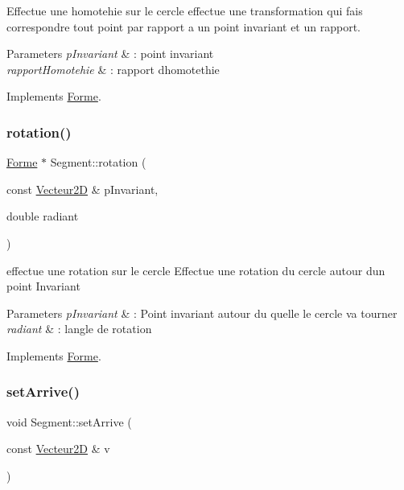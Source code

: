 Effectue une homotehie sur le cercle effectue une transformation qui fais correspondre tout point par rapport a un point invariant et un rapport. 


\begin{DoxyParams}{Parameters}
{\em p\+Invariant} & \+: point invariant \\
\hline
{\em rapport\+Homotehie} & \+: rapport d\textquotesingle{}homotethie \\
\hline
\end{DoxyParams}


Implements \mbox{\hyperlink{class_forme}{Forme}}.

\mbox{\label{class_segment_ae36f2f88b61ba79119398652411eb49b}} 
\subsubsection{\texorpdfstring{rotation()}{rotation()}}
{\footnotesize\ttfamily \mbox{\hyperlink{class_forme}{Forme}} $\ast$ Segment\+::rotation (\begin{DoxyParamCaption}\item[{const \mbox{\hyperlink{class_vecteur2_d}{Vecteur2D}} \&}]{p\+Invariant,  }\item[{double}]{radiant }\end{DoxyParamCaption})\hspace{0.3cm}{\ttfamily [virtual]}}



effectue une rotation sur le cercle Effectue une rotation du cercle autour d\textquotesingle{}un point Invariant 


\begin{DoxyParams}{Parameters}
{\em p\+Invariant} & \+: Point invariant autour du quelle le cercle va tourner \\
\hline
{\em radiant} & \+: l\textquotesingle{}angle de rotation \\
\hline
\end{DoxyParams}


Implements \mbox{\hyperlink{class_forme}{Forme}}.

\mbox{\label{class_segment_a3b33717b3f597a5a723b9f92d989ace2}} 
\subsubsection{\texorpdfstring{setArrive()}{setArrive()}}
{\footnotesize\ttfamily void Segment\+::set\+Arrive (\begin{DoxyParamCaption}\item[{const \mbox{\hyperlink{class_vecteur2_d}{Vecteur2D}} \&}]{v }\end{DoxyParamCaption})\hspace{0.3cm}{\ttfamily [inline]}}




